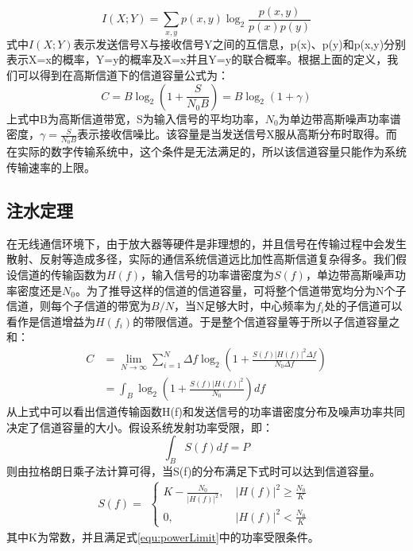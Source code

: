 \begin{equation}
I(X;Y)=\sum_{x,y}p(x,y)\log_2\frac{p(x,y)}{p(x)p(y)}
\end{equation}
式中$I(X;Y)$表示发送信号X与接收信号Y之间的互信息，p(x)、p(y)和p(x,y)分别表示X=x的概率，Y=y的概率及X=x并且Y=y的联合概率。根据上面的定义，我们可以得到在高斯信道下的信道容量公式为：
\begin{equation}
C = B\log_2\left(1+\frac{S}{N_0B}\right)=B\log_2(1+\gamma)
\end{equation}
上式中B为高斯信道带宽，S为输入信号的平均功率，$N_0$为单边带高斯噪声功率谱密度，$\gamma=\frac{S}{N_0B}$表示接收信噪比。该容量是当发送信号X服从高斯分布时取得。而在实际的数字传输系统中，这个条件是无法满足的，所以该信道容量只能作为系统传输速率的上限。
\subsection{注水定理}
在无线通信环境下，由于放大器等硬件是非理想的，并且信号在传输过程中会发生散射、反射等造成多径，实际的通信系统信道远比加性高斯信道复杂得多。我们假设信道的传输函数为$H(f)$，输入信号的功率谱密度为$S(f)$，单边带高斯噪声功率密度还是$N_0$。为了推导这样的信道的信道容量，可将整个信道带宽均分为N个子信道，则每个子信道的带宽为$B/N$，当N足够大时，中心频率为$f_i$处的子信道可以看作是信道增益为$H(f_i)$的带限信道。于是整个信道容量等于所以子信道容量之和：
\begin{equation}
\begin{aligned}
C&=\lim_{N\rightarrow \infty}\sum_{i=1}^{N}\Delta f\log_2\left(1+\frac{S(f)|H(f)|^2\Delta f}{N_0 \Delta f}\right) \\
&=\int_B \log_2\left(1+\frac{S(f)|H(f)|^2}{N_0}\right)df
\end{aligned}
\end{equation}
从上式中可以看出信道传输函数H(f)和发送信号的功率谱密度分布及噪声功率共同决定了信道容量的大小。假设系统发射功率受限，即：
\begin{equation}
\label{equ:powerLimit}
\int_B S(f)df=P
\end{equation}
则由拉格朗日乘子法计算可得，当S(f)的分布满足下式时可以达到信道容量。
\begin{equation}
\label{equ:water_filling}
S(f)=
\begin{aligned}
\begin{cases}
K-\frac{N_0}{|H(f)|^2},&\ |H(f)|^2\geq\frac{N_0}{K} \\
0  ,&\ |H(f)|^2<\frac{N_0}{K}
\end{cases}
\end{aligned}
\end{equation}
其中K为常数，并且满足式\ref{equ:powerLimit}中的功率受限条件。

